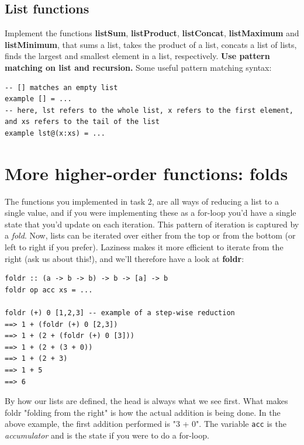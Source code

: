 \documentclass{article}
\begin{document}
\subsection{List functions}
Implement the functions \textbf{listSum}, \textbf{listProduct}, \textbf{listConcat}, \textbf{listMaximum} and \textbf{listMinimum}, that sums a list, takes the product of a list, concats a list of lists, finds the largest and smallest element in a list, respectively. \textbf{Use pattern matching on list and recursion.} Some useful pattern matching syntax:
\begin{lstlisting}
-- [] matches an empty list
example [] = ...
-- here, lst refers to the whole list, x refers to the first element, and xs refers to the tail of the list
example lst@(x:xs) = ...
\end{lstlisting}

\section{More higher-order functions: folds}

The functions you implemented in task 2, are all ways of reducing a list to a single value, and if you were implementing these as a for-loop you'd have a single state that you'd update on each iteration. This pattern of iteration is captured by a \emph{fold}. Now, lists can be iterated over either from the top or from the bottom (or left to right if you prefer). Laziness makes it more efficient to iterate from the right (ask us about this!), and we'll therefore have a look at \textbf{foldr}:
\begin{lstlisting}
foldr :: (a -> b -> b) -> b -> [a] -> b
foldr op acc xs = ... 

foldr (+) 0 [1,2,3] -- example of a step-wise reduction
==> 1 + (foldr (+) 0 [2,3])
==> 1 + (2 + (foldr (+) 0 [3]))
==> 1 + (2 + (3 + 0))
==> 1 + (2 + 3)
==> 1 + 5
==> 6
\end{lstlisting}
By how our lists are defined, the head is always what we see first. What makes foldr "folding from the right" is how the actual addition is being done. In the above example, the first addition performed is "3 + 0". The variable \texttt{acc} is the \emph{accumulator} and is the state if you were to do a for-loop. 
\end{document}
